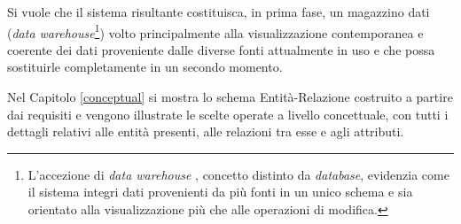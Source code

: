 Si vuole che il sistema risultante costituisca, in prima fase, un magazzino dati (\emph{data warehouse}\footnote{
    L'accezione di \emph{data warehouse} \cite{Ded16}, concetto distinto da \emph{database}, evidenzia come il sistema integri dati provenienti da più fonti in un unico schema e sia orientato alla visualizzazione più che alle operazioni di modifica.
}) volto principalmente alla visualizzazione contemporanea e coerente dei dati proveniente dalle diverse fonti attualmente in uso e che possa sostituirle completamente in un secondo momento.

Nel Capitolo \ref{conceptual} si mostra lo schema Entità-Relazione costruito a partire dai requisiti e vengono illustrate le scelte operate a livello concettuale, con tutti i dettagli relativi alle entità presenti, alle relazioni tra esse e agli attributi.